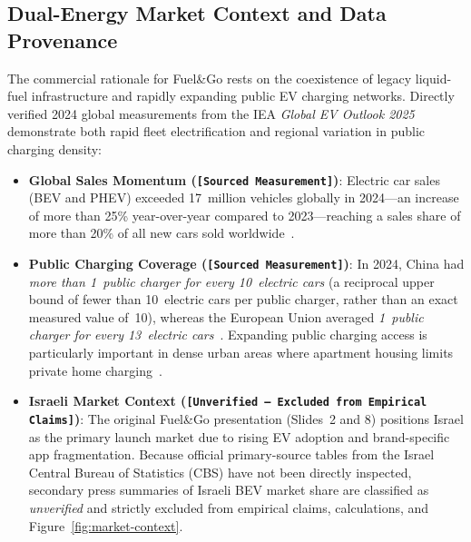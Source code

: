 

\subsection{Dual-Energy Market Context and Data Provenance}
\label{sec:market-context}

The commercial rationale for Fuel\&Go rests on the coexistence of legacy liquid-fuel infrastructure and rapidly expanding public EV charging networks. Directly verified 2024 global measurements from the IEA \emph{Global EV Outlook 2025}~\cite{iea2025gev} demonstrate both rapid fleet electrification and regional variation in public charging density:
\begin{itemize}[leftmargin=1.4em, itemsep=2pt]
  \item \textbf{Global Sales Momentum (\texttt{[Sourced Measurement]})}: Electric car sales (BEV and PHEV) exceeded 17~million vehicles globally in 2024---an increase of more than 25\% year-over-year compared to 2023---reaching a sales share of more than 20\% of all new cars sold worldwide~\cite{iea2025gev}.
  \item \textbf{Public Charging Coverage (\texttt{[Sourced Measurement]})}: In 2024, China had \emph{more than 1~public charger for every 10~electric cars} (a reciprocal upper bound of fewer than 10~electric cars per public charger, rather than an exact measured value of~10), whereas the European Union averaged \emph{1~public charger for every 13~electric cars}~\cite{iea2025gev}. Expanding public charging access is particularly important in dense urban areas where apartment housing limits private home charging~\cite{iea2025gev}.
  \item \textbf{Israeli Market Context (\texttt{[Unverified --- Excluded from Empirical Claims]})}: The original Fuel\&Go presentation (Slides~2 and 8) positions Israel as the primary launch market due to rising EV adoption and brand-specific app fragmentation. Because official primary-source tables from the Israel Central Bureau of Statistics (CBS) have not been directly inspected, secondary press summaries of Israeli BEV market share are classified as \emph{unverified} and strictly excluded from empirical claims, calculations, and Figure~\ref{fig:market-context}.
\end{itemize}

